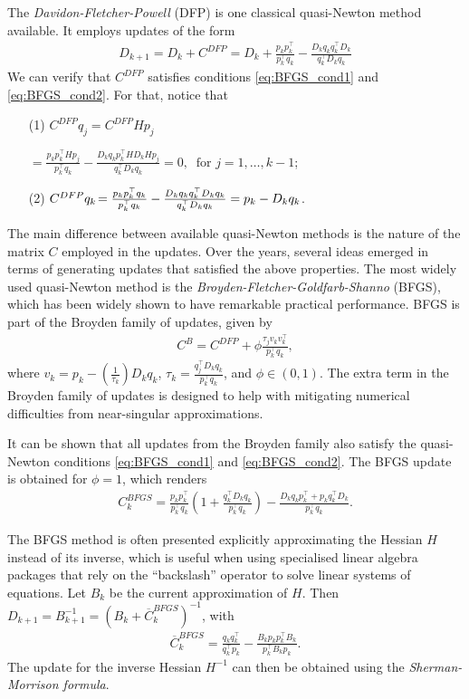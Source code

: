 The \emph{Davidon-Fletcher-Powell} (DFP) is one classical quasi-Newton method available. It employs updates of the form
%
\begin{align*}
D_{k+1} = D_k + C^{DFP} = D_{k} + \frac{p_kp_k^\top}{p_k^\top q_k} - \frac{D_kq_kq_k^\top D_k}{q_k^\top D_kq_k} 	
\end{align*}
%
We can verify that $C^{DFP}$ satisfies conditions \eqref{eq:BFGS_cond1} and \eqref{eq:BFGS_cond2}. For that, notice that
\begin{enumerate}
	\item[(1)] $C^{DFP}q_j = C^{DFP}Hp_j$
\item[]\hspace{38pt}$=\frac{p_kp_k^\top Hp_j}{p_k^\top q_k} - \frac{D_kq_kp_k^\top H D_kHp_j}{q_k^\top D_kq_k} = 0, \ \text{ for }j=1,\dots,k-1$;
\item[(2)] $C^{DFP}q_k \hspace{-1.5pt}= \frac{p_kp_k^\top q_k}{p_k^\top q_k} - \frac{D_kq_kq_k^\top D_kq_k}{q_k^\top D_kq_k} = p_k - D_kq_k$.
\end{enumerate} 
%
The main difference between available quasi-Newton methods is the nature of the matrix $C$ employed in the updates. Over the years, several ideas emerged in terms of generating updates that satisfied the above properties. The most widely used quasi-Newton method is the \emph{Broyden-Fletcher-Goldfarb-Shanno} (BFGS), which has been widely shown to have remarkable practical performance. BFGS is part of the Broyden family of updates, given by
%
\begin{align*}
C^B = C^{DFP} + \phi \frac{\tau_j v_kv_k^\top}{p_k^\top q_k},  	
\end{align*}
%
where $v_k = p_k - \left(\frac{1}{\tau_k}\right)D_kq_k$, $\tau_k = \frac{q_j^\top D_kq_k}{p_k^\top q_k}$, and $\phi \in (0,1)$. The extra term in the Broyden family of updates is designed to help with mitigating numerical difficulties from near-singular approximations.

It can be shown that all updates from the Broyden family also satisfy the quasi-Newton conditions \eqref{eq:BFGS_cond1} and \eqref{eq:BFGS_cond2}. The BFGS update is obtained for $\phi = 1$, which renders
\begin{align*}
	C^{BFGS}_k = \frac{p_kp_k^\top}{p_k^\top q_k}\left(1 + \frac{q_k^\top D_kq_k}{p_k^\top q_k}\right) - \frac{D_kq_kp_k^\top + p_kq_k^\top D_k}{p_k^\top q_k}.
\end{align*}

The BFGS method is often presented explicitly approximating the Hessian $H$ instead of its inverse, which is useful when using specialised linear algebra packages that rely on the ``backslash'' operator to solve linear systems of equations. Let $B_k$ be the current approximation of $H$. Then $D_{k+1} = B^{-1}_{k+1} = (B_k + \overline{C}_k^{BFGS})^{-1}$, with
%
\begin{align*}
\overline{C}_k^{BFGS} = \frac{q_kq_k^\top}{q^\top_kp_k} - \frac{B_kp_kp_k^\top B_k}{p_k^\top B_kp_k}.
\end{align*}
% 
The update for the inverse Hessian $H^{-1}$ can then be obtained using the \emph{Sherman-Morrison formula}.

